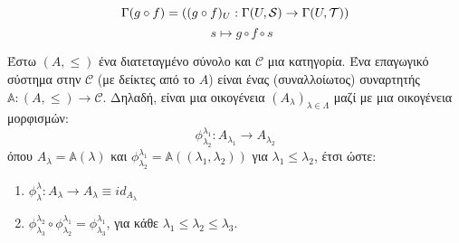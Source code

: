 \begin{figure}[H]
    \centering
{}
\end{figure}

$$\Gamma(g\circ f) = \left((g\circ f)_U : \Gamma(U,\mathcal{S}) \rightarrow \Gamma(U,\mathcal{T})\right)$$
$$\quad s\longmapsto g\circ f\circ s$$

\vspace{0.3truecm}

\begin{defn}
    Έστω $(A,\leq )$ ένα διατεταγμένο σύνολο και $\mathcal{C}$ μια κατηγορία. Ένα επαγωγικό σύστημα στην $\mathcal{C}$ (με δείκτες από το $A$) είναι ένας (συναλλοίωτος) συναρτητής $\mathbb{A} : (A,\leq) \rightarrow \mathcal{C}$. Δηλαδή, είναι μια οικογένεια $(A_{\lambda})_{\lambda \in \Lambda}$ μαζί με μια οικογένεια μορφισμών:
    $$\phi^{\lambda_1}_{\lambda_2} : A_{\lambda_1} \rightarrow A_{\lambda_2}$$ όπου $A_{\lambda} = \mathbb{A}(\lambda)$ και $\phi^{\lambda_1}_{\lambda_2} = \mathbb{A}((\lambda_1,\lambda_2))$ για $\lambda_1 \leq \lambda_2$, έτσι ώστε:
    \begin{enumerate}
        \item $\phi^{\lambda}_{\lambda}:A_{\lambda}\rightarrow A_{\lambda} \equiv id_{A_{\lambda}}$
        \item $\phi^{\lambda_2}_{\lambda_3} \circ \phi^{\lambda_1}_{\lambda_2} = \phi^{\lambda_1}_{\lambda_3}$, για κάθε $\lambda_1 \leq \lambda_2 \leq \lambda_3$.
    \end{enumerate}
\end{defn}
\begin{figure}[H]
    \centering
\end{figure}

